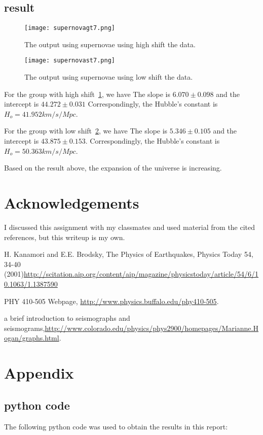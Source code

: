 \documentclass[11pt,letterpaper]{article}
\begin{document}
\subsection{result}

\begin{figure}
\begin{center}
\texttt{[image: supernovagt7.png]}
\caption{The output using supernovae using high shift the data.}
\label{figure5}
\end{center}
\end{figure}

\begin{figure}
\begin{center}
\texttt{[image: supernovast7.png]}
\caption{The output using supernovae using low shift the data.}
\label{figure6}
\end{center}
\end{figure}

For the group with high shift~\ref{figure5}, we have The slope is $6.070\pm0.098$ and the intercept is $44.272\pm0.031$
Correspondingly, the Hubble's constant is $H_o=41.952km/s/Mpc$.

For the group with low shift~\ref{figure6}, we have The slope is $5.346\pm0.105$ and the intercept is $43.875\pm0.153$.
Correspondingly, the Hubble's constant is $H_o=50.363km/s/Mpc$.

Based on the result above, the expansion of the universe is increasing.


\newpage
\section*{Acknowledgements}

I discussed this assignment with my classmates and used material from the
cited references, but this writeup is my own.

\begin{thebibliography}{9}

H. Kanamori and E.E. Brodsky, The Physics of Earthquakes, Physics Today 54, 34-40 (2001)\url{http://scitation.aip.org/content/aip/magazine/physicstoday/article/54/6/10.1063/1.1387590}

PHY 410-505 Webpage, \url{http://www.physics.buffalo.edu/phy410-505}.

a brief introduction to seismographs and seismograms,\url{http://www.colorado.edu/physics/phys2900/homepages/Marianne.Hogan/graphs.html}.

\end{thebibliography}

\newpage
\appendix
\section{Appendix}

\subsection{python code}

The following python code was used to obtain the results in this report:




\end{document}
